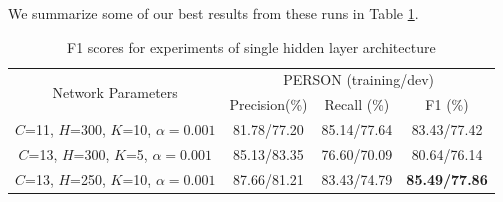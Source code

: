 \documentclass[letterpaper]{article}
\begin{document}
We summarize some of our best results from these runs in Table \ref{tab:network}.
\begin{table}[h]
\begin{center}
\begin{tabular}{|c|c|c|c|}
\hline
\multirow{2}{*}{Network Parameters} & 
\multicolumn{3}{|c|}{PERSON (training/dev)}
\\
\hhline{~---}
& Precision(\%) & Recall (\%) & F1 (\%) \\
\hline
$C$=11, $H$=300, $K$=10, $\alpha=0.001$ & 81.78/77.20 & 85.14/77.64 & 83.43/77.42
\\ \hline
$C$=13, $H$=300, $K$=5, $\alpha=0.001$ &
85.13/83.35 & 76.60/70.09 & 80.64/76.14
\\ \hline
$C$=13, $H$=250, $K$=10, $\alpha=0.001$ & 87.66/81.21 & 83.43/74.79 & \textbf{85.49/77.86} \\
\hline
\end{tabular}
\caption{F1 scores for experiments of single hidden layer architecture}
\label{tab:network}
\end{center}
\end{table}
\end{document}
